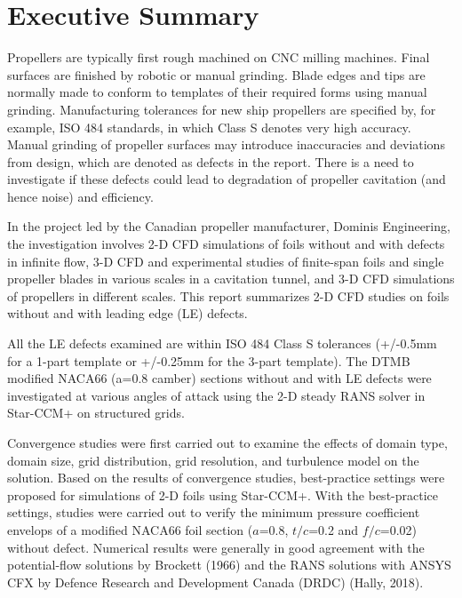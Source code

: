 \documentclass[onecolumn,11pt]{report}
\begin{document}
\begin{titlepage}
\printnomenclature

\end{titlepage}





\clearpage

\section*{\centering Executive Summary}
 
Propellers are typically first rough machined on CNC milling machines. Final surfaces are finished by robotic or manual grinding. Blade edges and tips are normally made to conform to templates of their required forms using manual grinding. Manufacturing tolerances for new ship propellers are specified by, for example, ISO 484 standards, in which Class S denotes very high accuracy. Manual grinding of propeller surfaces may introduce inaccuracies and deviations from design, which are denoted as defects in the report. There is a need to investigate if these defects could lead to degradation of propeller cavitation (and hence noise) and efficiency. 

In the project led by the Canadian propeller manufacturer, Dominis Engineering, the investigation involves 2-D CFD simulations of foils without and with defects in infinite flow, 3-D CFD and experimental studies of finite-span foils and single propeller blades in various scales in a cavitation tunnel, and 3-D CFD simulations of propellers in different scales. This report summarizes 2-D CFD studies on foils without and with leading edge (LE) defects.  
 
All the LE defects examined are within ISO 484 Class S tolerances (+/-0.5mm for a 1-part template or +/-0.25mm for the 3-part template). The DTMB modified NACA66 (a=0.8 camber) sections without and with LE defects were investigated at various angles of attack using the 2-D steady RANS solver in Star-CCM+ on structured grids.

Convergence studies were first carried out to examine the effects of domain type, domain size, grid distribution, grid resolution, and turbulence model on the solution. Based on the results of convergence studies, best-practice settings were proposed for simulations of 2-D foils using Star-CCM+. With the best-practice settings, studies were carried out to verify the minimum pressure coefficient envelops of a modified NACA66  foil section ($a$=0.8, $t/c$=0.2 and $f/c$=0.02) without defect. Numerical results were generally in good agreement with the potential-flow solutions by Brockett (1966) and the RANS solutions with ANSYS CFX by Defence Research and Development Canada (DRDC) (Hally, 2018). 
\end{document}

